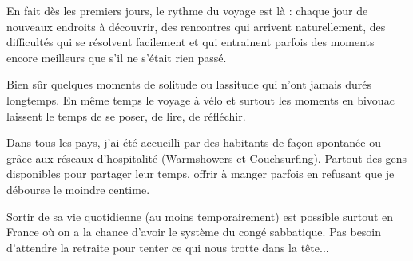  En fait dès les premiers jours, le rythme du voyage est là : chaque jour de nouveaux endroits à découvrir, des rencontres qui arrivent naturellement, des difficultés qui se résolvent facilement et qui entrainent parfois des moments encore meilleurs que s'il ne s'était rien passé.

 Bien sûr quelques moments de solitude ou lassitude qui n'ont jamais durés longtemps. En même temps le voyage à vélo et surtout les moments en bivouac laissent le temps de se poser, de lire, de réfléchir.

 Dans tous les pays, j'ai été accueilli par des habitants de façon spontanée ou grâce aux réseaux d'hospitalité (Warmshowers et Couchsurfing). Partout des gens disponibles pour partager leur temps, offrir à manger parfois en refusant que je débourse le moindre centime.

 Sortir de sa vie quotidienne (au moins temporairement) est possible surtout en France où on a la chance d'avoir le système du congé sabbatique. Pas besoin d'attendre la retraite pour tenter ce qui nous trotte dans la tête...


 
 
